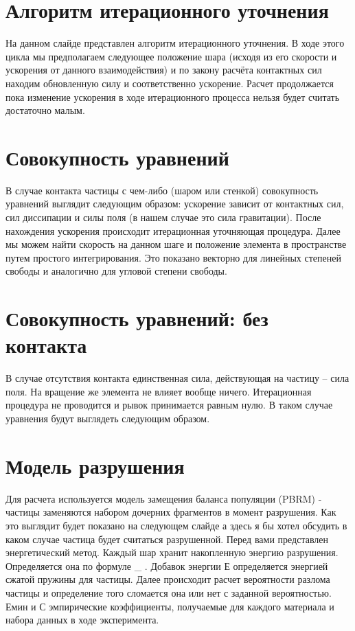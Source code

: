 \documentclass[a4paper]{article}
\begin{document}
\section{Алгоритм итерационного уточнения}

На данном слайде представлен алгоритм итерационного уточнения.
В ходе этого цикла мы предполагаем следующее положение шара (исходя из его скорости и ускорения от данного взаимодействия) и по закону расчёта контактных сил находим обновленную силу и соответственно ускорение.
Расчет продолжается пока изменение ускорения в ходе итерационного процесса нельзя будет считать достаточно малым.

\section{Совокупность уравнений}

В случае контакта частицы с чем-либо (шаром или стенкой) совокупность уравнений выглядит следующим образом: ускорение зависит от контактных сил, сил диссипации и силы поля (в нашем случае это сила гравитации).
После нахождения ускорения происходит итерационная уточняющая процедура.
Далее мы можем найти скорость на данном шаге и положение элемента в пространстве путем простого интегрирования.
Это показано векторно для линейных степеней свободы и аналогично для угловой степени свободы.

\section{Совокупность уравнений: без контакта}

В случае отсутствия контакта единственная сила, действующая на частицу -- сила поля.
На вращение же элемента не влияет вообще ничего.
Итерационная процедура не проводится и рывок принимается равным нулю.
В таком случае уравнения будут выглядеть следующим образом.

\section{Модель разрушения}

Для расчета используется модель замещения баланса популяции (PBRM) - частицы заменяются набором дочерних фрагментов в момент разрушения. 
Как это выглядит будет показано на следующем слайде а здесь я бы хотел обсудить в каком случае частица будет считаться разрушенной.
Перед вами представлен энергетический метод.
Каждый шар хранит накопленную энергию разрушения.
Определяется она по формуле \_ .
Добавок энергии Е определяется энергией сжатой пружины для частицы.
Далее происходит расчет вероятности разлома частицы и определение того сломается она или нет с заданной вероятностью.
Емин и С эмпирические коэффициенты, получаемые для каждого материала и набора данных в ходе эксперимента.
\end{document}
